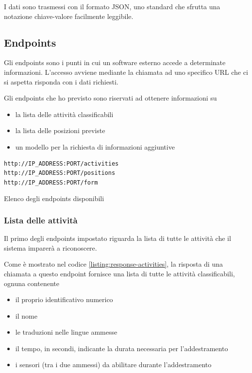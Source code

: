 I dati sono trasmessi con il formato JSON, uno standard che sfrutta una notazione chiave-valore facilmente leggibile.


\subsection{Endpoints}
Gli endpoints sono i punti in cui un software esterno accede a determinate informazioni. L'accesso avviene mediante la chiamata ad uno 
specifico URL che ci si aspetta risponda con i dati richiesti.

Gli endpoints che ho previsto sono riservati ad ottenere informazioni su
\begin{itemize}
    \item la lista delle attività classificabili
    \item la lista delle posizioni previste
    \item un modello per la richiesta di informazioni aggiuntive
\end{itemize}

\begin{listing}[H] 
    \begin{verbatim}
http://IP_ADDRESS:PORT/activities
http://IP_ADDRESS:PORT/positions
http://IP_ADDRESS:PORT/form
    \end{verbatim}
    \caption{Elenco degli endpoints disponibili}
    \label{listing:endpoint-positions}
\end{listing}

\subsubsection{Lista delle attività}
Il primo degli endpoints impostato riguarda la lista di tutte le attività che il sistema imparerà a riconoscere.

Come è mostrato nel codice \ref{listing:response-activities}, la risposta di una chiamata a questo endpoint fornisce una lista 
di tutte le attività classificabili, ognuna contenente 
\begin{itemize}
    \item il proprio identificativo numerico
    \item il nome
    \item le traduzioni nelle lingue ammesse
    \item il tempo, in secondi, indicante la durata necessaria per l'addestramento
    \item i sensori (tra i due ammessi) da abilitare durante l'addestramento
\end{itemize}

